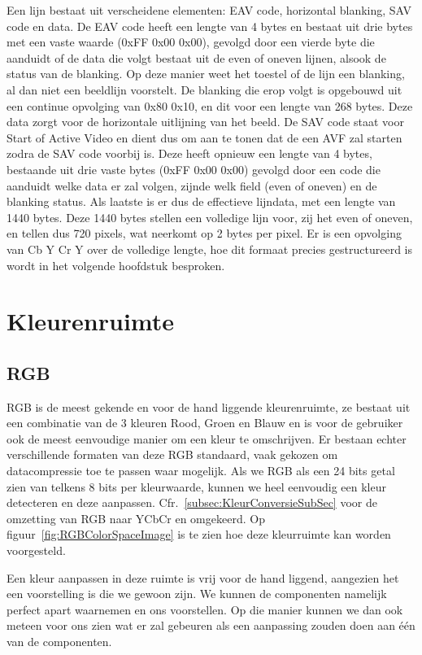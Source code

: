 		\par Een lijn bestaat uit verscheidene elementen: EAV code, horizontal blanking, SAV code en data. De EAV code heeft een lengte van 4 bytes en bestaat uit drie bytes met een vaste waarde (0xFF 0x00 0x00), gevolgd door een vierde byte die aanduidt of de data die volgt bestaat uit de even of oneven lijnen, alsook de status van de blanking. Op deze manier weet het toestel of de lijn een blanking, al dan niet een beeldlijn voorstelt. De blanking die erop volgt is opgebouwd uit een continue opvolging van 0x80 0x10, en dit voor een lengte van 268 bytes. Deze data zorgt voor de horizontale uitlijning van het beeld. De SAV code staat voor Start of Active Video en dient dus om aan te tonen dat de een AVF zal starten zodra de SAV code voorbij is. Deze heeft opnieuw een lengte van 4 bytes, bestaande uit drie vaste bytes (0xFF 0x00 0x00) gevolgd door een code die aanduidt welke data er zal volgen, zijnde welk field (even of oneven) en de blanking status.
		Als laatste is er dus de effectieve lijndata, met een lengte van 1440 bytes. Deze 1440 bytes stellen een volledige lijn voor, zij het even of oneven, en tellen dus 720 pixels, wat neerkomt op 2 bytes per pixel. Er is een opvolging van Cb Y Cr Y over de volledige lengte, hoe dit formaat precies gestructureerd is wordt in het volgende hoofdstuk besproken.

\section{Kleurenruimte}
	\subsection{RGB}
		\par RGB is de meest gekende en voor de hand liggende kleurenruimte, ze bestaat uit een combinatie van de 3 kleuren Rood, Groen en Blauw en is voor de gebruiker ook de meest eenvoudige manier om een kleur te omschrijven. Er bestaan echter verschillende formaten van deze RGB standaard, vaak gekozen om datacompressie toe te passen waar mogelijk. Als we RGB als een 24 bits getal zien van telkens 8 bits per kleurwaarde, kunnen we heel eenvoudig een kleur detecteren en deze aanpassen. Cfr.~\ref{subsec:KleurConversieSubSec} voor de omzetting van RGB naar YCbCr en omgekeerd. Op figuur~\ref{fig:RGBColorSpaceImage} is te zien hoe deze kleurruimte kan worden voorgesteld.

		\par Een kleur aanpassen in deze ruimte is vrij voor de hand liggend, aangezien het een voorstelling is die we gewoon zijn. We kunnen de componenten namelijk perfect apart waarnemen en ons voorstellen. Op die manier kunnen we dan ook meteen voor ons zien wat er zal gebeuren als een aanpassing zouden doen aan \'e\'en van de componenten.

